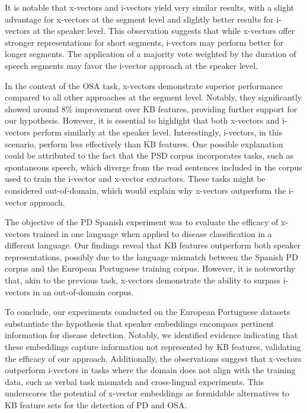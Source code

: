 It is notable that x-vectors and i-vectors yield very similar results, with a slight advantage for x-vectors at the segment level and slightly better results for i-vectors at the speaker level. This observation suggests that while x-vectors offer stronger representations for short segments, i-vectors may perform better for longer segments. The application of a majority vote weighted by the duration of speech segments may favor the i-vector approach at the speaker level.

In the context of the \ac{OSA} task, x-vectors demonstrate superior performance compared to all other approaches at the segment level. Notably, they significantly showed around 8\% improvement over \ac{KB} features, providing further support for our hypothesis. However, it is essential to highlight that both x-vectors and i-vectors perform similarly at the speaker level. Interestingly, i-vectors, in this scenario, perform less effectively than \ac{KB} features. One possible explanation could be attributed to the fact that the PSD corpus incorporates tasks, such as spontaneous speech, which diverge from the read sentences included in the corpus used to train the i-vector and x-vector extractors. These tasks might be considered out-of-domain, which would explain why x-vectors outperform the i-vector approach.

The objective of the \ac{PD} Spanish experiment was to evaluate the efficacy of x-vectors trained in one language when applied to disease classification in a different language. Our findings reveal that \ac{KB} features outperform both speaker representations, possibly due to the language mismatch between the Spanish \ac{PD} corpus and the European Portuguese training corpus. However, it is noteworthy that, akin to the previous task, x-vectors demonstrate the ability to surpass i-vectors in an out-of-domain corpus.

To conclude, our experiments conducted on the European Portuguese datasets substantiate the hypothesis that speaker embeddings encompass pertinent information for disease detection. Notably, we identified evidence indicating that these embeddings capture information not represented by \ac{KB} features, validating the efficacy of our approach. Additionally, the observations suggest that x-vectors outperform i-vectors in tasks where the domain does not align with the training data, such as verbal task mismatch and cross-lingual experiments. This underscores the potential of x-vector embeddings as formidable alternatives to \ac{KB} feature sets for the detection of \ac{PD} and \ac{OSA}.

